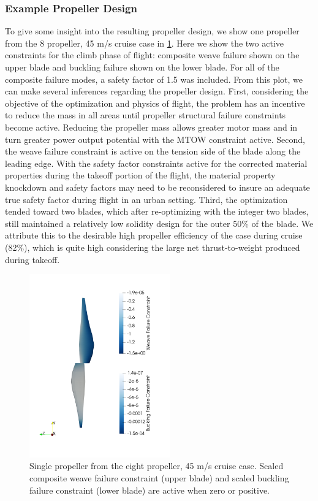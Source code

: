 \documentclass[conf]{new-aiaa}
\begin{document}
\subsubsection{Example Propeller Design}


To give some insight into the resulting propeller design, we show one propeller from the 8 propeller, 45 m/s cruise case in \cref{f:prop8_weave_buckling}. Here we show the two active constraints for the climb phase of flight: composite weave failure shown on the upper blade and buckling failure shown on the lower blade. For all of the composite failure modes, a safety factor of 1.5 was included. From this plot, we can make several inferences regarding the propeller design. First, considering the objective of the optimization and physics of flight, the problem has an incentive to reduce the mass in all areas until propeller structural failure constraints become active. Reducing the propeller mass allows greater motor mass and in turn greater power output potential with the MTOW constraint active. Second, the weave failure constraint is active on the tension side of the blade along the leading edge. With the safety factor constraints active for the corrected material properties during the takeoff portion of the flight, the material property knockdown and safety factors may need to be reconsidered to insure an adequate true safety factor during flight in an urban setting. Third, the optimization tended toward two blades, which after re-optimizing with the integer two blades, still maintained a relatively low solidity design for the outer 50\% of the blade. We attribute this to the desirable high propeller efficiency of the case during cruise (82\%), which is quite high considering the large net thrust-to-weight produced during takeoff.

\vspace{22pt}

\begin{figure}[H]
    \centering
    \includegraphics[trim={10.0cm 5.0cm 5.0cm 4cm},clip,angle = 0,width=2.4in]{prop8_weave_buckling}
    \vspace{0pt}
    \caption{Single propeller from the eight propeller, 45 m/s cruise case. Scaled composite weave failure constraint (upper blade) and scaled buckling failure constraint (lower blade) are active when zero or positive.}
    \label{f:prop8_weave_buckling}
\end{figure}
\end{document}
